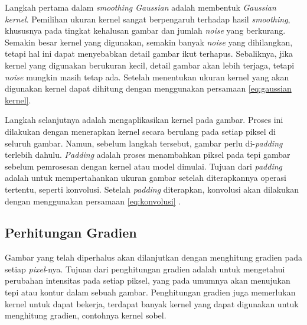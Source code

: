     Langkah pertama dalam \emph{smoothing Gaussian} adalah membentuk \emph{Gaussian kernel}. Pemilihan ukuran kernel sangat berpengaruh terhadap hasil \emph{smoothing}, khususnya pada tingkat kehalusan gambar dan jumlah \emph{noise} yang berkurang.
Semakin besar kernel yang digunakan, semakin banyak \emph{noise} yang dihilangkan, tetapi hal ini dapat menyebabkan detail gambar ikut terhapus. Sebaliknya, jika kernel yang digunakan berukuran kecil, detail gambar akan lebih terjaga, tetapi \emph{noise} mungkin masih tetap ada.
Setelah menentukan ukuran kernel yang akan digunakan kernel dapat dihitung dengan menggunakan persamaan \eqref{eq:gaussian kernel}.

    Langkah selanjutnya adalah mengaplikasikan kernel pada gambar. Proses ini dilakukan dengan menerapkan kernel secara berulang pada setiap piksel di seluruh gambar.
Namun, sebelum langkah tersebut, gambar perlu di-\emph{padding} terlebih dahulu. \emph{Padding} adalah proses menambahkan piksel pada tepi gambar sebelum pemrosesan dengan kernel atau model dimulai.
Tujuan dari \emph{padding} adalah untuk mempertahankan ukuran gambar setelah diterapkannya operasi tertentu, seperti konvolusi. 
Setelah \emph{padding} diterapkan, konvolusi akan dilakukan dengan menggunakan persamaan \eqref{eq:konvolusi} . 

\subsection{Perhitungan Gradien}
    Gambar yang telah diperhalus akan dilanjutkan dengan menghitung gradien pada setiap \emph{pixel}-nya. Tujuan dari penghitungan gradien adalah untuk mengetahui perubahan intensitas pada setiap piksel, yang pada umumnya akan menujukan tepi atau kontur dalam sebuah gambar.
Penghitungan gradien juga memerlukan kernel untuk dapat bekerja, terdapat banyak kernel yang dapat digunakan untuk menghitung gradien, contohnya kernel sobel. 

